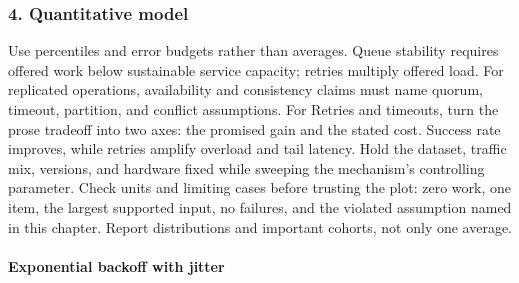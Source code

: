 \subsubsection*{4. Quantitative model}
Use percentiles and error budgets rather than averages. Queue stability requires offered work below sustainable service capacity; retries multiply offered load. For replicated operations, availability and consistency claims must name quorum, timeout, partition, and conflict assumptions.
For Retries and timeouts, turn the prose tradeoff into two axes: the promised gain and the stated cost. Success rate improves, while retries amplify overload and tail latency. Hold the dataset, traffic mix, versions, and hardware fixed while sweeping the mechanism's controlling parameter.
Check units and limiting cases before trusting the plot: zero work, one item, the largest supported input, no failures, and the violated assumption named in this chapter. Report distributions and important cohorts, not only one average.
\paragraph{Exponential backoff with jitter}
